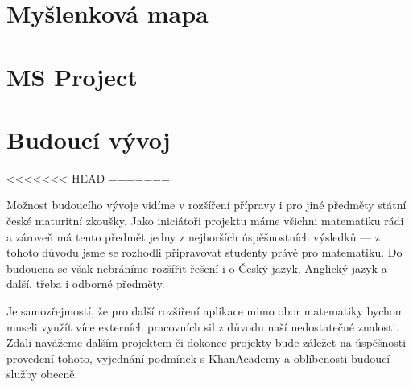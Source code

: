 \documentclass[12pt, a4paper]{report}
\begin{document}
\chapter{Myšlenková mapa}
\label{sec:org39bbf51}



\chapter{MS Project}
\label{sec:org90079c1}
\chapter{Budoucí vývoj}
<<<<<<< HEAD
\label{sec:org80a4ee9}
=======
\label{sec:orgde1ea73}

Možnost budoucího vývoje vidíme v rozšíření přípravy i pro jiné předměty státní české maturitní zkoušky. Jako iniciátoři projektu máme všichni matematiku rádi a zároveň má tento předmět jedny z nejhorších úspěšnostních výsledků --- z tohoto důvodu jsme se rozhodli připravovat studenty právě pro matematiku. Do budoucna se však nebráníme rozšířit řešení i o Český jazyk, Anglický jazyk a další, třeba i odborné předměty.

Je samozřejmostí, že pro další rozšíření aplikace mimo obor matematiky bychom museli využít více externích pracovních sil z důvodu naší nedostatečné znalosti. Zdali navážeme dalším projektem či dokonce projekty bude záležet na úspěšnosti provedení tohoto, vyjednání podmínek s KhanAcademy a oblíbenosti budoucí služby obecně.
\end{document}
